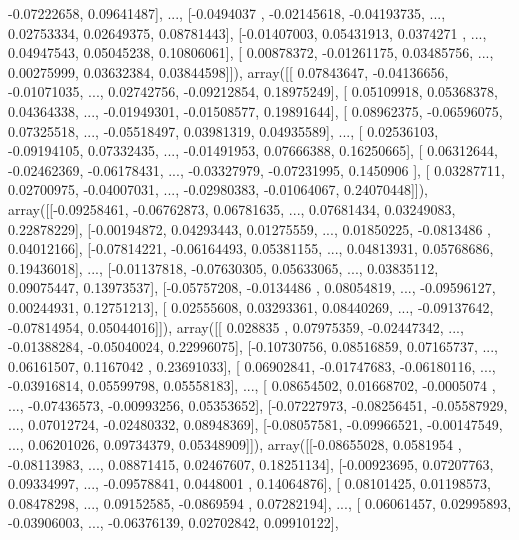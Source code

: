 \documentclass{article}
\begin{document}
        -0.07222658,  0.09641487],
       ..., 
       [-0.0494037 , -0.02145618, -0.04193735, ...,  0.02753334,
         0.02649375,  0.08781443],
       [-0.01407003,  0.05431913,  0.0374271 , ...,  0.04947543,
         0.05045238,  0.10806061],
       [ 0.00878372, -0.01261175,  0.03485756, ...,  0.00275999,
         0.03632384,  0.03844598]]), array([[ 0.07843647, -0.04136656, -0.01071035, ...,  0.02742756,
        -0.09212854,  0.18975249],
       [ 0.05109918,  0.05368378,  0.04364338, ..., -0.01949301,
        -0.01508577,  0.19891644],
       [ 0.08962375, -0.06596075,  0.07325518, ..., -0.05518497,
         0.03981319,  0.04935589],
       ..., 
       [ 0.02536103, -0.09194105,  0.07332435, ..., -0.01491953,
         0.07666388,  0.16250665],
       [ 0.06312644, -0.02462369, -0.06178431, ..., -0.03327979,
        -0.07231995,  0.1450906 ],
       [ 0.03287711,  0.02700975, -0.04007031, ..., -0.02980383,
        -0.01064067,  0.24070448]]), array([[-0.09258461, -0.06762873,  0.06781635, ...,  0.07681434,
         0.03249083,  0.22878229],
       [-0.00194872,  0.04293443,  0.01275559, ...,  0.01850225,
        -0.0813486 ,  0.04012166],
       [-0.07814221, -0.06164493,  0.05381155, ...,  0.04813931,
         0.05768686,  0.19436018],
       ..., 
       [-0.01137818, -0.07630305,  0.05633065, ...,  0.03835112,
         0.09075447,  0.13973537],
       [-0.05757208, -0.0134486 ,  0.08054819, ..., -0.09596127,
         0.00244931,  0.12751213],
       [ 0.02555608,  0.03293361,  0.08440269, ..., -0.09137642,
        -0.07814954,  0.05044016]]), array([[ 0.028835  ,  0.07975359, -0.02447342, ..., -0.01388284,
        -0.05040024,  0.22996075],
       [-0.10730756,  0.08516859,  0.07165737, ...,  0.06161507,
         0.1167042 ,  0.23691033],
       [ 0.06902841, -0.01747683, -0.06180116, ..., -0.03916814,
         0.05599798,  0.05558183],
       ..., 
       [ 0.08654502,  0.01668702, -0.0005074 , ..., -0.07436573,
        -0.00993256,  0.05353652],
       [-0.07227973, -0.08256451, -0.05587929, ...,  0.07012724,
        -0.02480332,  0.08948369],
       [-0.08057581, -0.09966521, -0.00147549, ...,  0.06201026,
         0.09734379,  0.05348909]]), array([[-0.08655028,  0.0581954 , -0.08113983, ...,  0.08871415,
         0.02467607,  0.18251134],
       [-0.00923695,  0.07207763,  0.09334997, ..., -0.09578841,
         0.0448001 ,  0.14064876],
       [ 0.08101425,  0.01198573,  0.08478298, ...,  0.09152585,
        -0.0869594 ,  0.07282194],
       ..., 
       [ 0.06061457,  0.02995893, -0.03906003, ..., -0.06376139,
         0.02702842,  0.09910122],
\end{document}
